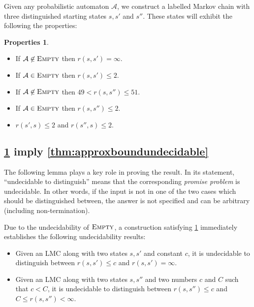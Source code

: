 \documentclass[10pt,a4paper]{amsart}
\numberwithin{equation}{section}
\theoremstyle{plain}
\theoremstyle{definition}
\newtheorem{properties}[thm]{Properties}
\theoremstyle{remark}
\newcommand\tvra{\mathit{r}}
\newcommand\pa{\mathcal{A}}
\begin{document}
Given any probabilistic automaton $\mathcal{A}$, we construct a labelled Markov chain with three distinguished starting states $s,s'$ and $s''$. These states will exhibit the following the  properties:
\begin{properties}\hfill
  \label{pty:constrctuionprops}
\begin{itemize}
\item If $\pa \not\in\textsc{Empty}$ then $\tvra(s,s') = \infty$.
\item If $\pa \in\textsc{Empty}$ then $\tvra(s,s') \le 2$.
\item If $\pa \not\in\textsc{Empty}$ then $49 < \tvra(s,s'') \le 51$.
\item If $\pa\in\textsc{Empty}$ then $\tvra(s,s'') \le 2$.
\item $\tvra(s',s)\le 2$ and $\tvra(s'',s)\le 2$.
\end{itemize}
\end{properties}
\subsection{\texorpdfstring{\cref{pty:constrctuionprops}}{Properties~\ref{pty:constrctuionprops}} imply \texorpdfstring{\cref{thm:approxboundundecidable}}{Theorem~\ref{thm:approxboundundecidable}}}
\label{sec:undeci:implytheorem}

The following lemma plays a key role in proving the result. In its statement, ``undecidable to distinguish''
means that the corresponding \emph{promise problem} is undecidable. In other words, if the input  is not in one of the
two cases which should be distinguished between, the answer is not specified and can be arbitrary (including non-termination).

Due to the undecidability of $\textsc{Empty}$, a construction satisfying \cref{pty:constrctuionprops} immediately establishes the following undecidability results:
\begin{lem}\label{lemma:technical:boundedandgap} \hfill
\begin{itemize}
\item  Given an LMC along with two states $s,s'$ and constant $c$, it is undecidable to distinguish between $\tvra(s,s') \le c$ and $\tvra(s,s') = \infty$.
\item Given an LMC along with two states $s,s''$ and two numbers $c$ and $C$ such that  $c < C$, it is undecidable to distinguish between $\tvra(s,s'') \le c$ and $C \le \tvra(s,s'') < \infty$.
\end{itemize}
\end{lem}
\end{document}
